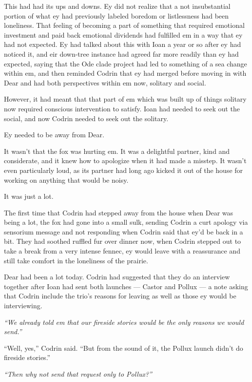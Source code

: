 This had had its ups and downs. Ey did not realize that a not insubstantial portion of what ey had previously labeled boredom or listlessness had been loneliness. That feeling of becoming a part of something that required emotional investment and paid back emotional dividends had fulfilled em in a way that ey had not expected. Ey had talked about this with Ioan a year or so after ey had noticed it, and eir down-tree instance had agreed far more readily than ey had expected, saying that the Ode clade project had led to something of a sea change within em, and then reminded Codrin that ey had merged before moving in with Dear and had both perspectives within em now, solitary and social.

However, it had meant that that part of em which was built up of things solitary now required conscious intervention to satisfy. Ioan had needed to seek out the social, and now Codrin needed to seek out the solitary.

Ey needed to be away from Dear.

It wasn't that the fox was hurting em. It was a delightful partner, kind and considerate, and it knew how to apologize when it had made a misstep. It wasn't even particularly loud, as its partner had long ago kicked it out of the house for working on anything that would be noisy.

It was just a lot.

The first time that Codrin had stepped away from the house when Dear was being a lot, the fox had gone into a small sulk, sending Codrin a curt apology via sensorium message and not responding when Codrin said that ey'd be back in a bit. They had soothed ruffled fur over dinner now, when Codrin stepped out to take a break from a very intense fennec, ey would leave with a reassurance and still take comfort in the loneliness of the prairie.

Dear had been a lot today. Codrin had suggested that they do an interview together after Ioan had sent both launches — Castor and Pollux — a note asking that Codrin include the trio's reasons for leaving as well as those ey would be interviewing.

\emph{``We already told em that our fireside stories would be the only reasons we would send.''}

``Well, yes,'' Codrin said. ``But from the sound of it, the Pollux launch didn't do fireside stories.''

\emph{``Then why not send that request only to Pollux?''}

